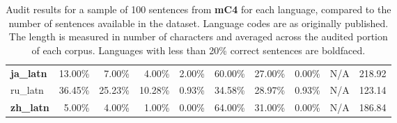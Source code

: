 \begin{table*}[hbt!]
{\begin{tabular}{l|rrrr|rrr|rr}
            \textbf{ja\_latn} & 13.00\% & 7.00\%  & 4.00\%  & 2.00\%  & 60.00\% & 27.00\% & 0.00\% & N/A          & 218.92     \\
            ru\_latn          & 36.45\% & 25.23\% & 10.28\% & 0.93\%  & 34.58\% & 28.97\% & 0.93\% & N/A          & 123.14     \\
            \textbf{zh\_latn} & 5.00\%  & 4.00\%  & 1.00\%  & 0.00\%  & 64.00\% & 31.00\% & 0.00\% & N/A          & 186.84     \\
            \bottomrule
        \end{tabular}%
    }
    \caption{Audit results for a sample of 100 sentences from \textbf{mC4} for each language, compared to the number of sentences available in the dataset. Language codes are as originally published. The length is measured in number of characters and averaged across the audited portion of each corpus. Languages with less than 20\% correct sentences are boldfaced.}
    \label{tab:mc4-full}
\end{table*}
\clearpage


